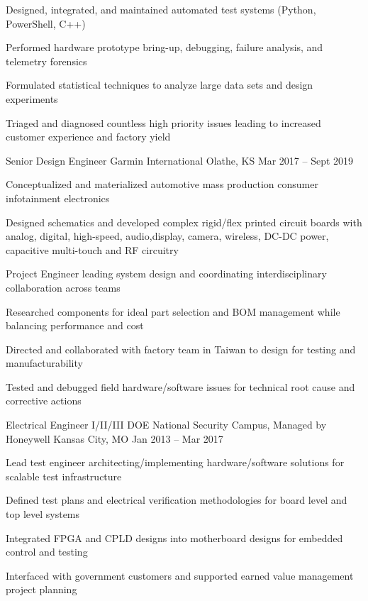 \documentclass[]{awesome-cv}
\begin{document}
\begin{cventries}
{\begin{cvitems}
		\item {Designed, integrated, and maintained automated test systems (Python, PowerShell, C++)}
		\item {Performed hardware prototype bring-up, debugging, failure analysis, and telemetry forensics}
		\item {Formulated statistical techniques to analyze large data sets and design experiments}
		\item {Triaged and diagnosed countless high priority issues leading to increased customer experience and factory yield}
	\end{cvitems}}
	\cventry
	{Senior Design Engineer}
	{Garmin International}
	{Olathe, KS}
	{Mar 2017 – Sept 2019}
	{\begin{cvitems}
		\item {Conceptualized and materialized automotive mass production consumer infotainment electronics}
		\item {Designed schematics and developed complex rigid/flex printed circuit boards with analog, digital, high-speed, audio,\hfill \break  display, camera, wireless, DC-DC power, capacitive multi-touch and RF circuitry}
		\item {Project Engineer leading system design and coordinating interdisciplinary collaboration across teams}
		\item {Researched components for ideal part selection and BOM management while balancing performance and cost}
		\item {Directed and collaborated with factory team in Taiwan to design for testing and manufacturability}
		\item {Tested and debugged field hardware/software issues for technical root cause and corrective actions}
		\end{cvitems}}
	\cventry
	{Electrical Engineer I/II/III}
	{DOE National Security Campus, Managed by Honeywell}
	{Kansas City, MO}
	{Jan 2013 – Mar 2017}
	{\begin{cvitems}
		\item {Lead test engineer architecting/implementing hardware/software solutions for scalable test infrastructure}
		\item {Defined test plans and electrical verification methodologies for board level and top level systems}
		\item {Integrated FPGA and CPLD designs into motherboard designs for embedded control and testing}
		\item {Interfaced with government customers and supported earned value management project planning}

\end{cvitems}}
\end{cventries}
\end{document}
